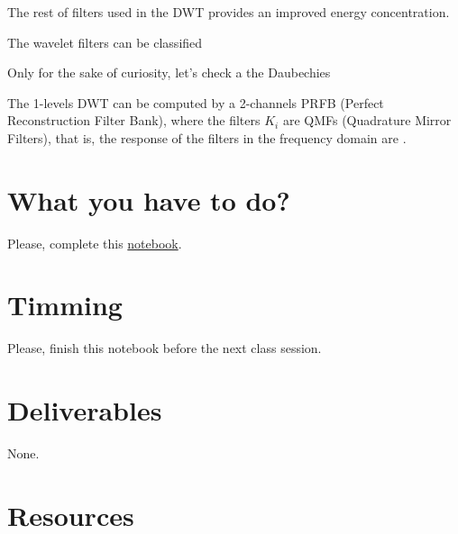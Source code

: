 The rest of filters used in the DWT provides an improved energy
concentration.

The wavelet filters can be classified

Only for the sake of curiosity, let's check a the Daubechies 

The 1-levels DWT can be computed by a 2-channels PRFB (Perfect
Reconstruction Filter Bank), where the filters $K_i$ are QMFs
(Quadrature Mirror Filters), that is, the response of the filters in the frequency domain are .

\section{What you have to do?}
  
Please, complete this
\href{https://github.com/Sistemas-Multimedia/Sistemas-Multimedia.github.io/blob/master/study_guide/MDWT/MDWT.ipynb}{notebook}.

\section{Timming}

Please, finish this notebook before the next class session.

\section{Deliverables}

None.

\section{Resources}


